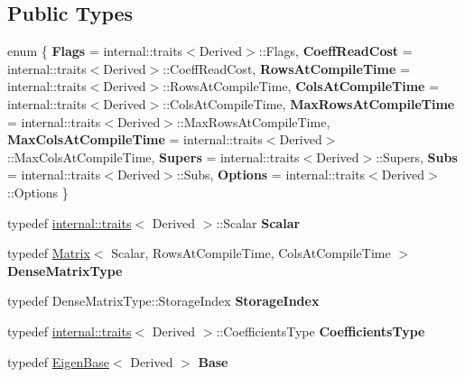 \subsection*{Public Types}
\begin{DoxyCompactItemize}
\item 
\mbox{\label{class_eigen_1_1internal_1_1_band_matrix_base_a87d8d377ea648e8c6e7c94d92c9480fc}} 
enum \{ \newline
{\bfseries Flags} = internal\+::traits$<$Derived$>$\+::Flags, 
{\bfseries Coeff\+Read\+Cost} = internal\+::traits$<$Derived$>$\+::Coeff\+Read\+Cost, 
{\bfseries Rows\+At\+Compile\+Time} = internal\+::traits$<$Derived$>$\+::Rows\+At\+Compile\+Time, 
{\bfseries Cols\+At\+Compile\+Time} = internal\+::traits$<$Derived$>$\+::Cols\+At\+Compile\+Time, 
\newline
{\bfseries Max\+Rows\+At\+Compile\+Time} = internal\+::traits$<$Derived$>$\+::Max\+Rows\+At\+Compile\+Time, 
{\bfseries Max\+Cols\+At\+Compile\+Time} = internal\+::traits$<$Derived$>$\+::Max\+Cols\+At\+Compile\+Time, 
{\bfseries Supers} = internal\+::traits$<$Derived$>$\+::Supers, 
{\bfseries Subs} = internal\+::traits$<$Derived$>$\+::Subs, 
\newline
{\bfseries Options} = internal\+::traits$<$Derived$>$\+::Options
 \}
\item 
\mbox{\label{class_eigen_1_1internal_1_1_band_matrix_base_afca234d64175589fd9f35bb54e99a0cb}} 
typedef \mbox{\hyperlink{struct_eigen_1_1internal_1_1traits}{internal\+::traits}}$<$ Derived $>$\+::Scalar {\bfseries Scalar}
\item 
\mbox{\label{class_eigen_1_1internal_1_1_band_matrix_base_a4b465b7b73aa09b04a05f9d94f6a7f58}} 
typedef \mbox{\hyperlink{class_eigen_1_1_matrix}{Matrix}}$<$ Scalar, Rows\+At\+Compile\+Time, Cols\+At\+Compile\+Time $>$ {\bfseries Dense\+Matrix\+Type}
\item 
\mbox{\label{class_eigen_1_1internal_1_1_band_matrix_base_a2f52fc1689db7ecbf7abe30d2b184f65}} 
typedef Dense\+Matrix\+Type\+::\+Storage\+Index {\bfseries Storage\+Index}
\item 
\mbox{\label{class_eigen_1_1internal_1_1_band_matrix_base_a17c354627a5d45343b09ed4254b2871c}} 
typedef \mbox{\hyperlink{struct_eigen_1_1internal_1_1traits}{internal\+::traits}}$<$ Derived $>$\+::Coefficients\+Type {\bfseries Coefficients\+Type}
\item 
\mbox{\label{class_eigen_1_1internal_1_1_band_matrix_base_af06810be4827bc9268e0d02fea6b4e62}} 
typedef \mbox{\hyperlink{struct_eigen_1_1_eigen_base}{Eigen\+Base}}$<$ Derived $>$ {\bfseries Base}
\end{DoxyCompactItemize}
